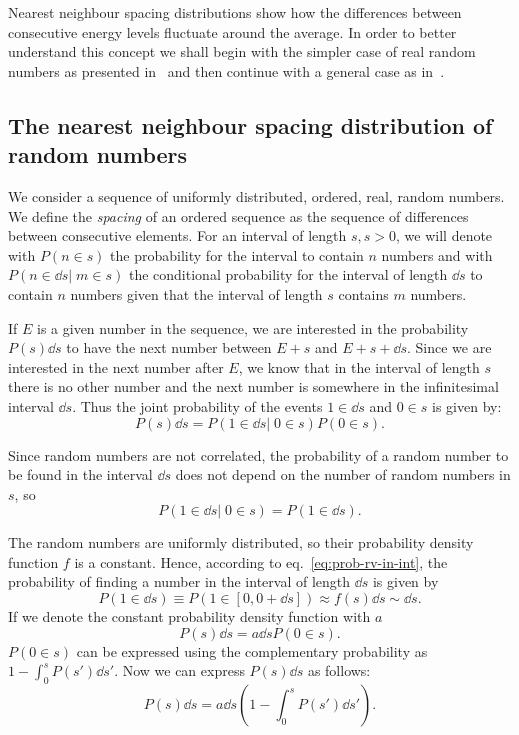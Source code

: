 \documentclass[../thesis.tex]{subfiles}
\theoremstyle{definition}
\begin{document}

Nearest neighbour spacing distributions show how the differences
between consecutive energy levels fluctuate around the average.
In order to better understand this concept we shall begin with the simpler
case of real random numbers as presented in~\cite{Timberlake2006} and then
continue with a general case as in~\cite{Brody1981}.

\subsection{The nearest neighbour spacing distribution of random numbers}

We consider a sequence of uniformly distributed, ordered, real, random numbers.
We define the \emph{spacing} of an ordered sequence as the sequence of
differences between consecutive elements.
For an interval of length \(s, s>0\), we will denote with \( P(n \in s) \) the probability
for the interval to contain $n$ numbers and with \( P(n \in \dd{s} |\; m \in s) \)
the conditional probability for the interval of length \( \dd{s} \) to contain
$n$ numbers given that the interval of length $s$ contains $m$ numbers.

If $E$ is a given number in the sequence, we are interested in the probability
\( P(s)\dd{s} \) to have the next number between \( E+s \) and \( E+s+\dd{s} \).
Since we are interested in the next number after $E$, we know that in the
interval of length $s$ there is no other number and the next number is somewhere
in the infinitesimal interval \(\dd{s}\). Thus the joint probability of
the events \(1 \in \dd{s}\) and \(0 \in s\) is given by:
\begin{equation}
  \label{eq:jpr-next}
  P(s)\dd{s} = P(1 \in \dd{s} |\; 0 \in s) P(0 \in s).
\end{equation}

Since random numbers are not correlated, the probability of a random number to be found
in the interval \( \dd{s} \) does not depend on the number of random numbers in $s$, so
\[
  P(1 \in \dd{s} |\; 0 \in s) = P(1 \in \dd{s}).
\]

The random numbers are uniformly distributed, so their probability density function
\(f\) is a constant. Hence, according to eq.~\eqref{eq:prob-rv-in-int}, the probability
of finding a number in the interval of length \( \dd{s} \) is given by
\[
  P(1 \in \dd{s}) \equiv P(1 \in [0, 0+\dd{s}]) \approx f(s) \dd{s} \sim \dd{s}.
\]
If we denote the constant probability density function with $a$
\[
  P(s)\dd{s} = a \dd{s} P(0 \in s).
\]
\( P(0 \in s) \) can be expressed using the complementary probability as
\( {1 - \int_0^s P(s') \dd{s'}} \). Now we can express \( P(s)\dd{s} \) as follows:
\[
  P(s)\dd{s} = a \dd{s} \left( 1 - \int_0^s P(s') \dd{s'} \right).
\]
\end{document}
